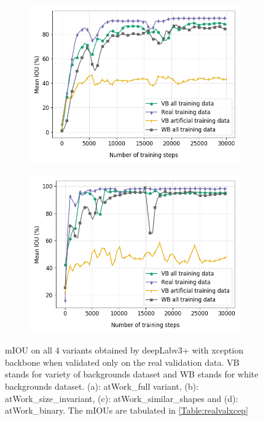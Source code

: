 \begin{figure}
\begin{subfigure}{.5\textwidth}
			\includegraphics[width=1\linewidth]{images/re_val_xcep_shape}
			\caption{}
		\end{subfigure}
		\begin{subfigure}{.5\textwidth}
			\centering
			\includegraphics[width=1\linewidth]{images/re_val_xcep_binary}
			\caption{}
		\end{subfigure}
		\caption{mIOU on all 4 variants obtained by deepLabv3+ with xception backbone when validated only on the real validation data. VB stands for variety of backgrounds dataset and WB stands for white backgrounds dataset. (a): atWork\_full variant, (b): atWork\_size\_invariant, (c): atWork\_similar\_shapes and (d): atWork\_binary. The mIOUs are tabulated in \ref{Table:realvalxcep}}
		\label{Fig:realvalxcep}
	\end{figure}

